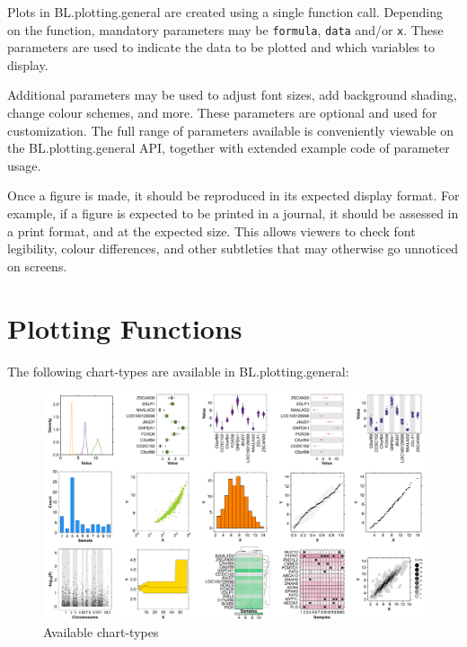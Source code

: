 \documentclass[letterpaper]{report}\usepackage[]{graphicx}\usepackage[]{color}
\begin{document}
Plots in BL.plotting.general are created using a single function call. Depending on the function, mandatory parameters may be \verb|formula|, \verb|data| and/or \verb|x|. These parameters are used to indicate the data to be plotted and which variables to display.

Additional parameters may be used to adjust font sizes, add background shading, change colour schemes, and more. These parameters are optional and used for customization. The full range of parameters available is conveniently viewable on the BL.plotting.general API, together with extended example code of parameter usage.

Once a figure is made, it should be reproduced in its expected display format. For example, if a figure is expected to be printed in a journal, it should be assessed in a print format, and at the expected size. This allows viewers to check font legibility, colour differences, and other subtleties that may otherwise go unnoticed on screens.

\section{Plotting Functions}
The following  chart-types are available in BL.plotting.general:

\begin{figure}[!ht]
  \begin{center}
     \includegraphics[width=150mm]{Figures/chart-types.png}
     \caption{Available chart-types}
  \end{center}
\end{figure}
\end{document}
